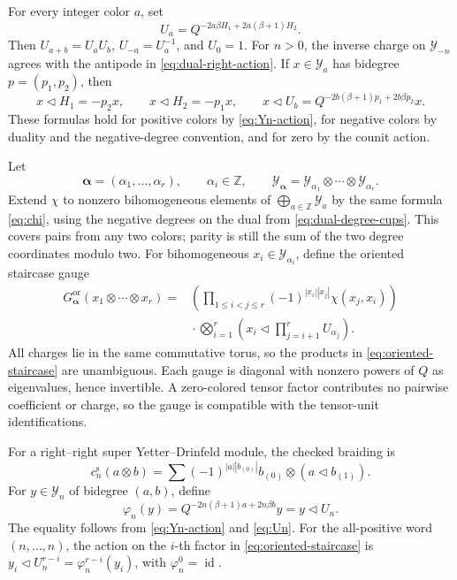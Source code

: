 \documentclass[11pt,a4paper]{article}
\newcommand{\ot}{\otimes}
\newcommand{\tri}{\mathbin{\triangleleft}}
\newcommand{\id}{\operatorname{id}}
\theoremstyle{definition}
\theoremstyle{remark}
\begin{document}
For every integer color \(a\), set
\begin{equation}\label{eq:oriented-objects-charges}
 U_a=Q^{-2a\beta H_1+2a(\beta+1)H_2}.
\end{equation}
Then \(U_{a+b}=U_aU_b\), \(U_{-a}=U_a^{-1}\), and \(U_0=1\).
For \(n>0\), the inverse charge on \(\mathcal Y_{-n}\) agrees with
the antipode in \eqref{eq:dual-right-action}.
If \(x\in\mathcal Y_a\) has bidegree \(p=(p_1,p_2)\), then
\[
 x\tri H_1=-p_2x,\qquad x\tri H_2=-p_1x,\qquad
 x\tri U_b=Q^{-2b(\beta+1)p_1+2b\beta p_2}x.
\]
These formulas hold for positive colors by \eqref{eq:Yn-action},
for negative colors by duality and the negative-degree convention,
and for zero by the counit action.

Let
\[
 \boldsymbol\alpha=(\alpha_1,\ldots,\alpha_r),
 \qquad
 \alpha_i\in\mathbb Z,\qquad
 \mathcal Y_{\boldsymbol\alpha}
 =\mathcal Y_{\alpha_1}\ot\cdots\ot \mathcal Y_{\alpha_r}.
\]
Extend \(\chi\) to nonzero bihomogeneous elements of
\(\bigoplus_{a\in\mathbb Z}\mathcal Y_a\) by the same formula
\eqref{eq:chi}, using the negative degrees on the dual from
\eqref{eq:dual-degree-cups}.  This covers pairs from any two colors;
parity is still the sum of the two degree coordinates modulo two.  For bihomogeneous
\(x_i\in \mathcal Y_{\alpha_i}\), define the oriented staircase gauge
\begin{equation}\label{eq:oriented-staircase}
\begin{aligned}
G_{\boldsymbol\alpha}^{\mathrm{or}}
(x_1\ot\cdots\ot x_r)
={}&
\left(\prod_{1\leq i<j\leq r}(-1)^{|x_i||x_j|}\chi(x_j,x_i)\right)\\
&{}\cdot
\bigotimes_{i=1}^r
\left(x_i\tri\prod_{j=i+1}^rU_{\alpha_j}\right).
\end{aligned}
\end{equation}
All charges lie in the same commutative torus, so the products in
\eqref{eq:oriented-staircase} are unambiguous.  Each gauge is diagonal
with nonzero powers of \(Q\) as eigenvalues, hence invertible.
A zero-colored tensor factor contributes no pairwise coefficient or
charge, so the gauge is compatible with the tensor-unit identifications.

For a right--right super Yetter--Drinfeld module, the checked braiding is
\begin{equation}\label{eq:YD-braiding}
 c_n^{\mathrm s}(a\ot b)
 =\sum(-1)^{|a||b_{(0)}|}
 b_{(0)}\ot(a\tri b_{(1)}).
\end{equation}
For \(y\in\mathcal Y_n\) of bidegree \((a,b)\), define
\[
 \varphi_n(y)=Q^{-2n(\beta+1)a+2n\beta b}y=y\tri U_n.
\]
The equality follows from \eqref{eq:Yn-action} and \eqref{eq:Un}.
For the all-positive word \((n,\ldots,n)\), the action on the
\(i\)-th factor in \eqref{eq:oriented-staircase} is
\(y_i\tri U_n^{r-i}=\varphi_n^{r-i}(y_i)\), with
\(\varphi_n^0=\id\).
\end{document}
